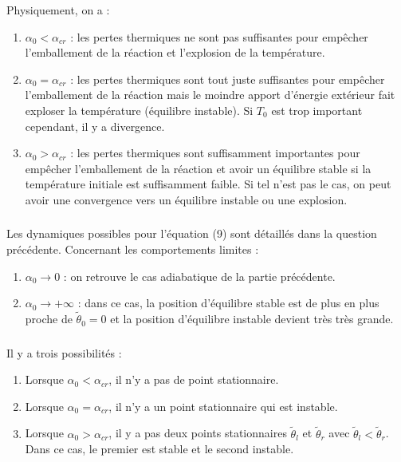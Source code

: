 \documentclass[10pt,a4paper]{report}
\begin{document}
	Physiquement, on a :
	\begin{enumerate}
		\item $\alpha_0 < \alpha_{cr}$ : les pertes thermiques ne sont pas suffisantes pour empêcher l'emballement de la réaction et l'explosion de la température.
		\item $\alpha_0 = \alpha_{cr}$ : les pertes thermiques sont tout juste suffisantes pour empêcher l'emballement de la réaction mais le moindre apport d'énergie extérieur fait exploser la température (équilibre instable). Si $T_0$ est trop important cependant, il y a divergence.
		\item $\alpha_0 > \alpha_{cr}$ : les pertes thermiques sont suffisamment importantes pour empêcher l'emballement de la réaction et avoir un équilibre stable si la température initiale est suffisamment faible. Si tel n'est pas le cas, on peut avoir une convergence vers un équilibre instable ou une explosion.
	\end{enumerate}
	
	\subsubsection{} %
	Les dynamiques possibles pour l'équation (9) sont détaillés dans la question précédente. Concernant les comportements limites : 
	\begin{enumerate}
		\item $\alpha_0 \rightarrow 0$ : on retrouve le cas adiabatique de la partie précédente.
		\item $\alpha_0 \rightarrow + \infty$ : dans ce cas, la position d'équilibre stable est de plus en plus proche de $\tilde{\theta}_0 = 0$ et la position d'équilibre instable devient très très grande.
	\end{enumerate}	
	

	\subsubsection{} %
	Il y a trois possibilités : 
	\begin{enumerate}
		\item Lorsque $\alpha_0 < \alpha_{cr}$,  il n'y a pas de point stationnaire.
		\item Lorsque $\alpha_0 = \alpha_{cr}$,  il n'y a un point stationnaire qui est instable.
		\item Lorsque $\alpha_0 > \alpha_{cr}$,  il y a pas deux points stationnaires $\tilde{\theta}_l$ et $\tilde{\theta}_r$ avec $\tilde{\theta}_l < \tilde{\theta}_r$. Dans ce cas, le premier est stable et le second instable.
	\end{enumerate}
\end{document}
